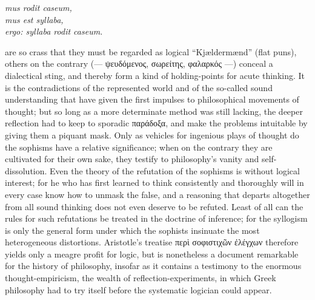 \documentclass[12pt]{book}
\begin{document}
\begin{center}
\textit{mus rodit caseum,}\\
\textit{mus est syllaba,}\\
\textit{ergo: syllaba rodit caseum.}
\end{center}

\noindent are so crass that they must be regarded as logical
``Kjældermænd'' (flat puns), others on the contrary (--- ψευδόμενος,
σωρείτης, φαλαρκός ---) conceal a dialectical sting, and thereby form a kind
of holding-points for acute thinking. It is the contradictions of the
represented world and of the so-called sound understanding that have given
the first impulses to philosophical movements of thought; but so long as a
more determinate method was still lacking, the deeper reflection had to keep
to sporadic παράδοξα, and make the problems intuitable by giving them a
piquant mask. Only as vehicles for ingenious plays of thought do the
sophisms have a relative significance; when on the contrary they are
cultivated for their own sake, they testify to philosophy's vanity and
self-dissolution. Even the theory of the refutation of the sophisms is
without logical interest; for he who has first learned to think consistently
and thoroughly will in every case know how to unmask the false, and a
reasoning that departs altogether from all sound thinking does not even
deserve to be refuted. Least of all can the rules for such refutations be
treated in the doctrine of inference; for the syllogism is only the general
form under which the sophists insinuate the most heterogeneous distortions.
Aristotle's treatise περὶ σοφιστιχῶν ἐλέγχων therefore yields only a meagre
profit for logic, but is nonetheless a document remarkable for the history
of philosophy, insofar as it contains a testimony to the enormous
thought-empiricism, the wealth of reflection-experiments, in which Greek
philosophy had to try itself before the systematic logician could appear.
\end{document}
